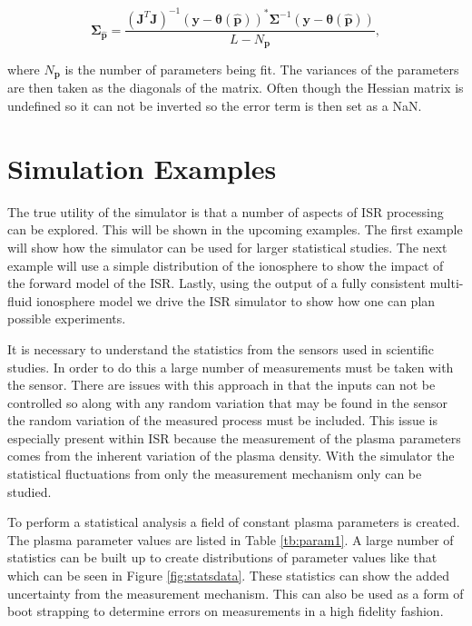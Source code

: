 \documentclass[draft,ras]{agutex}
\begin{document}
\begin{article}
\begin{equation}
\label{eqn:jacinv}
\bm{\Sigma}_{\hat{\mathbf{p}}}=\frac{(\mathbf{J}^T\mathbf{J})^{-1} (\mathbf{y}-\bm{\theta}(\hat{\mathbf{p}}))^*\bm{\Sigma}^{-1}(\mathbf{y}-\bm{\theta}(\hat{\mathbf{p}}))}{L-N_{\mathbf{p}}},
\end{equation}

\noindent where $N_{\mathbf{p}}$ is the number of parameters being fit. The variances of the parameters are then taken as the diagonals of the matrix. Often though the Hessian matrix is undefined so it can not be inverted so the error term is then set as a NaN.

\section{Simulation Examples}
The true utility of the simulator is that a number of aspects of ISR processing can be explored. This will be shown in the upcoming examples. The first example will show how the simulator can be used for larger statistical studies. The next example will use a simple distribution of the ionosphere to show the impact of the forward model of the ISR. Lastly, using the output of a fully consistent multi-fluid ionosphere model we drive the ISR simulator to show how one can plan possible experiments.

It is necessary to understand the statistics from the sensors used in scientific studies. In order to do this a large number of measurements must be taken with the sensor. There are issues with this approach in that the inputs can not be controlled so along with any random variation that may be found in the sensor the random variation of the measured process must be included. This issue is especially present within ISR because the measurement of the plasma parameters comes from the inherent variation of the plasma density. With the simulator the statistical fluctuations from only the measurement mechanism only can be studied.

To perform a statistical analysis a field of constant plasma parameters is created. The plasma parameter values are listed in Table \ref{tb:param1}. A large number of statistics can be built up to create distributions of parameter values like that which can be seen in Figure \ref{fig:statsdata}. These statistics can show the added uncertainty from the measurement mechanism. This can also be used as a form of boot strapping to determine errors on measurements in a high fidelity fashion.



\end{article}
\end{document}
